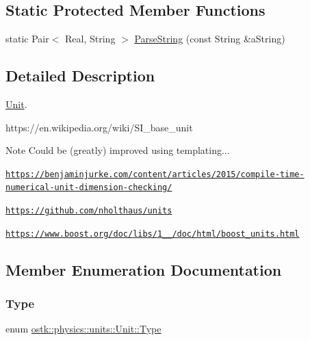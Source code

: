 \subsection*{Static Protected Member Functions}
\begin{DoxyCompactItemize}
\item 
static Pair$<$ Real, String $>$ \hyperlink{classostk_1_1physics_1_1units_1_1_unit_a3255171111d8c94390f6f87bbcb892ed}{Parse\+String} (const String \&a\+String)
\end{DoxyCompactItemize}


\subsection{Detailed Description}
\hyperlink{classostk_1_1physics_1_1units_1_1_unit}{Unit}. 

https\+://en.wikipedia.\+org/wiki/\+S\+I\+\_\+base\+\_\+unit

\begin{DoxyNote}{Note}
Could be (greatly) improved using templating... 

\href{https://benjaminjurke.com/content/articles/2015/compile-time-numerical-unit-dimension-checking/}{\tt https\+://benjaminjurke.\+com/content/articles/2015/compile-\/time-\/numerical-\/unit-\/dimension-\/checking/} 

\href{https://github.com/nholthaus/units}{\tt https\+://github.\+com/nholthaus/units} 

\href{https://www.boost.org/doc/libs/1_67_0/doc/html/boost_units.html}{\tt https\+://www.\+boost.\+org/doc/libs/1\+\_\+\_/doc/html/boost\+\_\+units.\+html} 
\end{DoxyNote}


\subsection{Member Enumeration Documentation}
\mbox{\label{classostk_1_1physics_1_1units_1_1_unit_a113924e2dd880bd0e95d4ee9646ea4ca}} 
\subsubsection{\texorpdfstring{Type}{Type}}
{\footnotesize\ttfamily enum \hyperlink{classostk_1_1physics_1_1units_1_1_unit_a113924e2dd880bd0e95d4ee9646ea4ca}{ostk\+::physics\+::units\+::\+Unit\+::\+Type}\hspace{0.3cm}{\ttfamily [strong]}}

